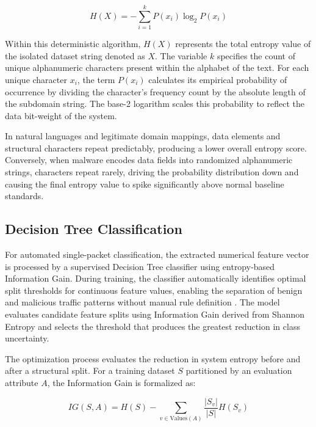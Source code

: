 \documentclass[14pt, a4paper, oneside]{report}
\begin{document}
\begin{equation}
H(X) = -\sum_{i=1}^{k} P(x_i) \log_2 P(x_i)
\end{equation}

Within this deterministic algorithm, $H(X)$ represents the total entropy value of the isolated dataset string denoted as $X$. The variable $k$ specifies the count of unique alphanumeric characters present within the alphabet of the text. For each unique character $x_i$, the term $P(x_i)$ calculates its empirical probability of occurrence by dividing the character's frequency count by the absolute length of the subdomain string. The base-2 logarithm scales this probability to reflect the data bit-weight of the system. 

In natural languages and legitimate domain mappings, data elements and structural characters repeat predictably, producing a lower overall entropy score. Conversely, when malware encodes data fields into randomized alphanumeric strings, characters repeat rarely, driving the probability distribution down and causing the final entropy value to spike significantly above normal baseline standards.


\subsection{Decision Tree Classification}
For automated single-packet classification, the extracted numerical feature vector is processed by a supervised Decision Tree classifier using entropy-based Information Gain. During training, the classifier automatically identifies optimal split thresholds for continuous feature values, enabling the separation of benign and malicious traffic patterns without manual rule definition \cite{quinlan1986}. The model evaluates candidate feature splits using Information Gain derived from Shannon Entropy and selects the threshold that produces the greatest reduction in class uncertainty.

The optimization process evaluates the reduction in system entropy before and after a structural split. For a training dataset $S$ partitioned by an evaluation attribute $A$, the Information Gain is formalized as:

\begin{equation}
IG(S, A) = H(S) - \sum_{v \in \text{Values}(A)} \frac{|S_v|}{|S|} H(S_v)
\end{equation}
\end{document}

